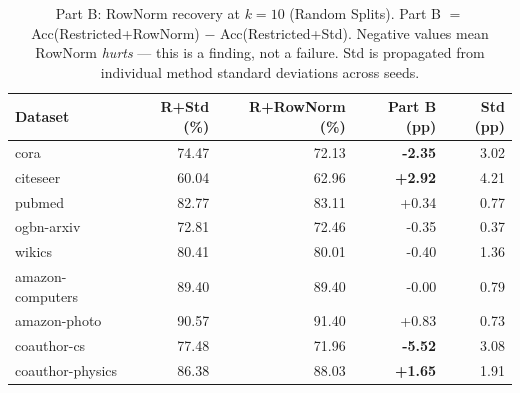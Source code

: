 \begin{table}[t]
\centering\small\setlength{\tabcolsep}{6pt}
\caption{Part B: RowNorm recovery at $k=10$ (Random Splits). Part B $=$ Acc(Restricted+RowNorm) $-$ Acc(Restricted+Std). Negative values mean RowNorm \emph{hurts} --- this is a finding, not a failure. Std is propagated from individual method standard deviations across seeds.}
\label{tab:part_b_random}
\begin{tabular}{lrrrr}
\toprule
Dataset & R+Std (\%) & R+RowNorm (\%) & Part B (pp) & Std (pp) \\
\midrule
cora & 74.47 & 72.13 & \textbf{-2.35} & 3.02 \\
citeseer & 60.04 & 62.96 & \textbf{+2.92} & 4.21 \\
pubmed & 82.77 & 83.11 & +0.34 & 0.77 \\
ogbn\mbox{-}arxiv & 72.81 & 72.46 & -0.35 & 0.37 \\
wikics & 80.41 & 80.01 & -0.40 & 1.36 \\
amazon\mbox{-}computers & 89.40 & 89.40 & -0.00 & 0.79 \\
amazon\mbox{-}photo & 90.57 & 91.40 & +0.83 & 0.73 \\
coauthor\mbox{-}cs & 77.48 & 71.96 & \textbf{-5.52} & 3.08 \\
coauthor\mbox{-}physics & 86.38 & 88.03 & \textbf{+1.65} & 1.91 \\
\bottomrule\end{tabular}\end{table}